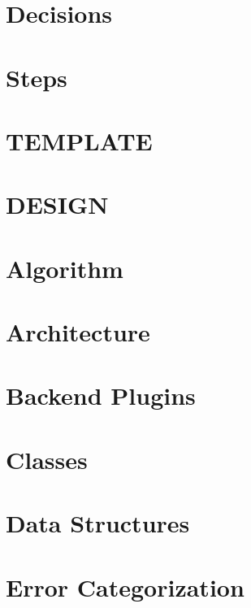 \let\mypdfximage\pdfximage\def\pdfximage{\immediate\mypdfximage}\documentclass[twoside]{book}
\newcommand{\+}{\discretionary{\mbox{\scriptsize$\hookleftarrow$}}{}{}}
\begin{document}
\chapter{Decisions}
\label{doc_decisions_README_md}

\chapter{Steps}
\label{doc_decisions_STEPS_md}

\chapter{TEMPLATE}
\label{doc_decisions_TEMPLATE_md}

\chapter{DESIGN}
\label{doc_DESIGN_md}

\chapter{Algorithm}
\label{doc_dev_algorithm_md}

\chapter{Architecture}
\label{doc_dev_architecture_md}

\chapter{Backend Plugins}
\label{doc_dev_backend-plugins_md}

\chapter{Classes}
\label{doc_dev_classes_md}

\chapter{Data Structures}
\label{doc_dev_data-structures_md}

\chapter{Error Categorization}
\label{doc_dev_error-categorization_md}

\end{document}
